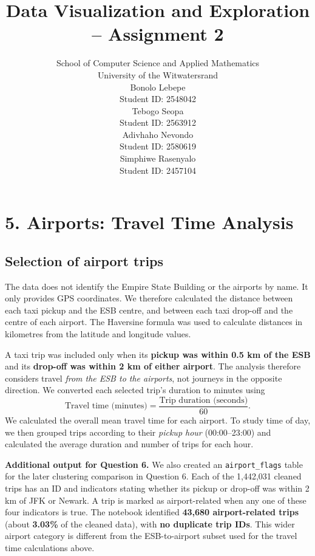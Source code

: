 \documentclass{article}
\title{Data Visualization and Exploration -- Assignment 2}
\author{%
School of Computer Science and Applied Mathematics \\
  University of the Witwatersrand \\
  \AND
  Bonolo Lebepe \\
  Student ID: 2548042 \\
  \And
  Tebogo Seopa \\
  Student ID:  2563912
 \\
  \AND
  Adivhaho Nevondo \\
  Student ID: 2580619 \\
  \And
  Simphiwe Rasenyalo \\
  Student ID: 2457104 \\
}
\begin{document}
\maketitle
\begin{abstract}

\end{abstract}


\section*{5. Airports: Travel Time Analysis}
\label{sec:q5_airports}

\subsection*{Selection of airport trips }
The data does not identify the Empire State Building or the airports by
name. It only provides GPS coordinates. We therefore calculated the
distance between each taxi pickup and the ESB centre, and between each
taxi drop-off and the centre of each airport. The Haversine formula was
used to calculate distances in kilometres from the latitude and longitude
values.

A taxi trip was included only when its \textbf{pickup was within 0.5 km of
the ESB} and its \textbf{drop-off was within 2 km of either airport}. The
analysis therefore considers travel \emph{from the ESB to the airports},
not journeys in the opposite direction. We converted each selected trip's
duration to minutes using
\begin{equation}
    \text{Travel time (minutes)} =
    \frac{\text{Trip duration (seconds)}}{60}.
\end{equation}
We calculated the overall mean travel time for each airport. To study
time of day, we then grouped trips according to their \emph{pickup hour}
(00:00--23:00) and calculated the average duration and number of trips
for each hour.

\medskip
\noindent\textbf{Additional output for Question 6.} We also created an \texttt{airport\_flags} table for the later
clustering comparison in Question 6. Each of the 1,442,031 cleaned
trips has an ID and indicators stating whether its pickup or drop-off
was within 2 km of JFK or Newark. A trip is marked as airport-related
when any one of these four indicators is true. The notebook identified
\textbf{43,680 airport-related trips} (about \textbf{3.03\%} of the
cleaned data), with \textbf{no duplicate trip IDs}. This wider airport
category is different from the ESB-to-airport subset used for the travel
time calculations above.
\end{document}
